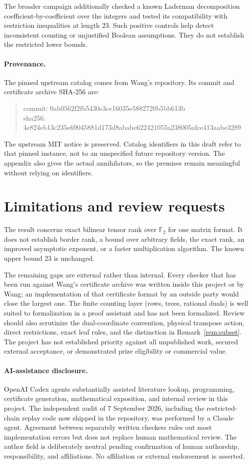 \documentclass[11pt]{article}
\newcommand{\F}{\mathbb F_2}
\theoremstyle{definition}
\begin{document}
The broader campaign additionally checked a known Laderman decomposition coefficient-by-coefficient over the integers and tested its compatibility with restriction inequalities at length 23. Such positive controls help detect inconsistent counting or unjustified Boolean assumptions. They do not establish the restricted lower bounds.

\paragraph{Provenance.}
The pinned upstream catalog comes from Wang's repository. Its commit and certificate archive SHA-256 are:
\begin{quote}\small\ttfamily
commit: 0ab0562f2fb5430e3ce16035e5882720b5bb613b\\
sha256: 4e824eb13c235e69045881d173d8ababe622421055a238005afce413aabe3289
\end{quote}
The upstream MIT notice is preserved. Catalog identifiers in this draft refer to that pinned instance, not to an unspecified future repository version. The appendix also gives the actual annihilators, so the premises remain meaningful without relying on identifiers.

\section{Limitations and review requests}
The result concerns exact bilinear tensor rank over $\F$ for one matrix format. It does not establish border rank, a bound over arbitrary fields, the exact rank, an improved asymptotic exponent, or a faster multiplication algorithm. The known upper bound 23 is unchanged.

The remaining gaps are external rather than internal. Every checker that has been run against Wang's certificate archive was written inside this project or by Wang; an implementation of that certificate format by an outside party would close the largest one. The finite counting layer (rows, trees, rational duals) is well suited to formalization in a proof assistant and has not been formalized. Review should also scrutinize the dual-coordinate convention, physical transpose action, direct restrictions, exact leaf rules, and the distinction in Remark~\ref{rem:subset}. The project has not established priority against all unpublished work, secured external acceptance, or demonstrated prize eligibility or commercial value.

\paragraph{AI-assistance disclosure.}
OpenAI Codex agents substantially assisted literature lookup, programming, certificate generation, mathematical exposition, and internal review in this project. The independent audit of 7 September 2026, including the restricted-chain replay code now shipped in the repository, was performed by a Claude agent. Agreement between separately written checkers rules out most implementation errors but does not replace human mathematical review. The author field is deliberately neutral pending confirmation of human authorship, responsibility, and affiliations. No affiliation or external endorsement is asserted.
\end{document}
